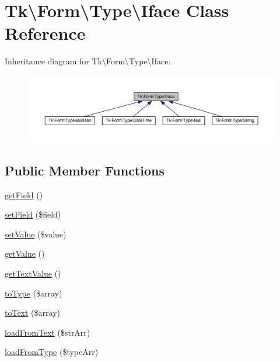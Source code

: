 \hypertarget{classTk_1_1Form_1_1Type_1_1Iface}{\section{Tk\textbackslash{}Form\textbackslash{}Type\textbackslash{}Iface Class Reference}
\label{classTk_1_1Form_1_1Type_1_1Iface}
}


Inheritance diagram for Tk\textbackslash{}Form\textbackslash{}Type\textbackslash{}Iface\+:\nopagebreak
\begin{figure}[H]
\begin{center}
\leavevmode
\includegraphics[width=350pt]{classTk_1_1Form_1_1Type_1_1Iface__inherit__graph}
\end{center}
\end{figure}
\subsection*{Public Member Functions}
\begin{DoxyCompactItemize}
\item 
\hyperlink{classTk_1_1Form_1_1Type_1_1Iface_ab7690bac7c47ccf3cb6c7cc8a6f02a99}{get\+Field} ()
\item 
\hyperlink{classTk_1_1Form_1_1Type_1_1Iface_a877c61a1d88fa32b28e4b87ed884c8ce}{set\+Field} (\$field)
\item 
\hyperlink{classTk_1_1Form_1_1Type_1_1Iface_a762247cf50d37305e4588c6b1edc5ed1}{set\+Value} (\$value)
\item 
\hyperlink{classTk_1_1Form_1_1Type_1_1Iface_a9ff099989b946924a7f79d05b91486dd}{get\+Value} ()
\item 
\hyperlink{classTk_1_1Form_1_1Type_1_1Iface_ac631bcfcb29a7f035de5e23d273f73fc}{get\+Text\+Value} ()
\item 
\hyperlink{classTk_1_1Form_1_1Type_1_1Iface_ab800a82de047293e6effb48815571b72}{to\+Type} (\$array)
\item 
\hyperlink{classTk_1_1Form_1_1Type_1_1Iface_a4d3b2fe521caa3364d61d7f9cee43246}{to\+Text} (\$array)
\item 
\hyperlink{classTk_1_1Form_1_1Type_1_1Iface_a145f18a1a3aee233c693c0258b13f61d}{load\+From\+Text} (\$str\+Arr)
\item 
\hyperlink{classTk_1_1Form_1_1Type_1_1Iface_ac641a4310b506486a87194eb22172c53}{load\+From\+Type} (\$type\+Arr)
\end{DoxyCompactItemize}
